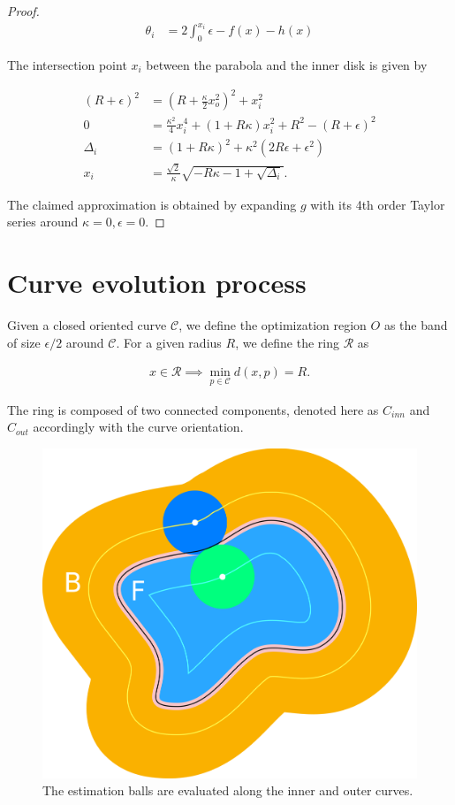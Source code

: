 \begin{proof}
\begin{align*}
	\theta_i &= 2\int_{0}^{x_i}{\epsilon - f(x) - h(x)}	\end{align*}

The intersection point $x_i$ between the parabola and the inner disk is given by
	
\begin{align*}
	(R+\epsilon)^2 &= (R+\frac{\kappa}{2}x_o^2)^2 + x_i^2\\
	0 &= \frac{\kappa^2}{4}x_i^4 + (1+R\kappa)x_i^2 + R^2 - (R+\epsilon)^2	\\
\Delta_i &= (1+R\kappa)^2 + \kappa^2(2R\epsilon + \epsilon^2)\\
x_i &= \frac{\sqrt{2}}{\kappa}\sqrt{-R\kappa-1+\sqrt{\Delta_i}}.
\end{align*}

The claimed approximation is obtained by expanding $g$ with its  4th order Taylor series around $\kappa=0,\epsilon=0$.
\end{proof}

\section{Curve evolution process}

Given a closed oriented curve $\mathcal{C}$, we define the optimization region $O$ as the band of size $\epsilon /2$ around $\mathcal{C}$. For a given radius $R$, we define the ring $\mathcal{R}$ as

\begin{align*}
	x \in \mathcal{R} \implies \min_{p \in \mathcal{C}} d(x,p) = R.
\end{align*}

The ring is composed of two connected components, denoted here as $C_{inn}$ and $C_{out}$ accordingly with the curve orientation.


\begin{figure}[h!]\label{fig:integral}
\center
\includegraphics[scale=0.25]{figures/chapter5/max-energy/integral-2.png}
\caption{The estimation balls are evaluated along the inner and outer curves.}
\end{figure}


